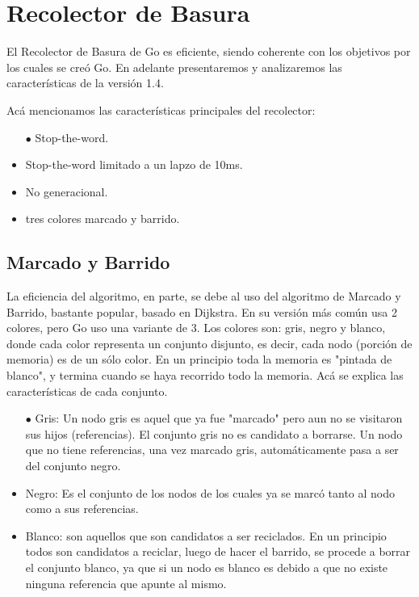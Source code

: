 \documentclass{article}
\begin{document}
\section{Recolector de Basura}
El Recolector de Basura de Go es eficiente, siendo coherente con los objetivos por los cuales se creó Go. En adelante presentaremos y analizaremos las características de la versión 1.4. 

Acá mencionamos las características principales del recolector:

\begin{itemize}
\item [$\bullet$]Stop-the-word.
\item Stop-the-word limitado a un lapzo de 10ms.
\item No generacional.
\item tres colores marcado y barrido.

\end{itemize}
\subsection{Marcado y Barrido}

La eficiencia del algoritmo, en parte, se debe al uso del algoritmo de Marcado y Barrido, bastante popular, basado en Dijkstra. En su versión más común usa 2 colores, pero Go uso una variante de 3. Los colores son: gris, negro y blanco, donde cada color representa un conjunto disjunto, es decir, cada nodo (porción de memoria) es de un sólo color. En un principio toda la memoria es "pintada de blanco", y termina cuando se haya recorrido todo la memoria. 
Acá se explica las características de cada conjunto.
\begin{itemize}
	\item[$\bullet$] Gris: Un nodo gris es aquel que ya fue "marcado" pero aun no se visitaron sus hijos (referencias). El conjunto gris no es candidato a borrarse. Un nodo que no tiene referencias, una vez marcado gris, automáticamente pasa a ser del conjunto negro. 
	\item Negro: Es el conjunto de los nodos de los cuales ya se marcó tanto al nodo como a sus referencias.
	\item Blanco: son aquellos que son candidatos a ser reciclados. En un principio todos son candidatos a reciclar, luego de hacer el barrido, se procede a borrar el conjunto blanco, ya que si un nodo es blanco es debido a que no existe ninguna referencia que apunte al mismo. 
\end{itemize}
\end{document}

